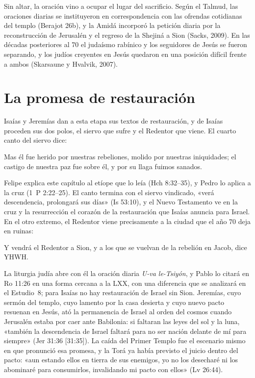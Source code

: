Sin altar, la oración vino a ocupar el lugar del sacrificio. Según el Talmud, las oraciones diarias se instituyeron en correspondencia con las ofrendas cotidianas del templo (Berajot 26b), y la Amidá incorporó la petición diaria por la reconstrucción de Jerusalén y el regreso de la Shejiná a Sion (Sacks, 2009). En las décadas posteriores al 70 el judaísmo rabínico y los seguidores de Jesús se fueron separando, y los judíos creyentes en Jesús quedaron en una posición difícil frente a ambos (Skarsaune y Hvalvik, 2007).

\section{La promesa de restauración}

Isaías y Jeremías dan a esta etapa sus textos de restauración, y de Isaías proceden sus dos polos, el siervo que sufre y el Redentor que viene. El cuarto canto del siervo dice:

\begin{cita}Mas él fue herido por nuestras rebeliones, molido por nuestras iniquidades; el castigo de nuestra paz fue sobre él, y por su llaga fuimos sanados.\end{cita}

Felipe explica este capítulo al etíope que lo leía (Hch 8:32--35), y Pedro lo aplica a la cruz (1~P 2:22--25). El canto termina con el siervo vindicado, «verá descendencia, prolongará sus días» (Is 53:10), y el Nuevo Testamento ve en la cruz y la resurrección el corazón de la restauración que Isaías anuncia para Israel. En el otro extremo, el Redentor viene precisamente a la ciudad que el año 70 deja en ruinas:

\begin{cita}Y vendrá el Redentor a Sion, y a los que se vuelvan de la rebelión en Jacob, dice YHWH.\end{cita}

La liturgia judía abre con él la oración diaria \emph{U-va le-Tsiyón}, y Pablo lo citará en Ro 11:26 en una forma cercana a la LXX, con una diferencia que se analizará en el Estudio~8; para Isaías no hay restauración de Israel sin Sion. Jeremías, cuyo sermón del templo, cuyo lamento por la casa desierta y cuyo nuevo pacto resuenan en Jesús, ató la permanencia de Israel al orden del cosmos cuando Jerusalén estaba por caer ante Babilonia: si faltaran las leyes del sol y la luna, «también la descendencia de Israel faltará para no ser nación delante de mí para siempre» (Jer 31:36 [31:35]). La caída del Primer Templo fue el escenario mismo en que pronunció esa promesa, y la Torá ya había previsto el juicio dentro del pacto: «aun estando ellos en tierra de sus enemigos, yo no los desecharé ni los abominaré para consumirlos, invalidando mi pacto con ellos» (Lv 26:44).

